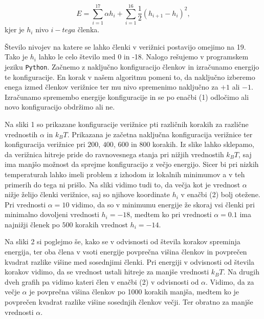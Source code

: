 \documentclass[slovene,11pt,a4paper]{article}
\begin{document}
\begin{equation}
E = \sum_{i=1}^{17} \alpha h_i + \sum_{i=1}^{16} \frac{1}{2} (h_{i+1} - h_i)^2,
\end{equation}
kjer je $h_i$ nivo $i-tega$ členka.

Število nivojev na katere se lahko členki v verižnici postavijo omejimo na 19. Tako je $h_i$ lahko le celo število med 0 in -18. Nalogo rešujemo v programskem jeziku \texttt{Python}. Začnemo z naključno konfiguracijo členkov in izračunamo energijo te konfiguracije. En korak v našem algoritmu pomeni to, da naključno izberemo enega izmed členkov verižnice ter mu nivo spremenimo naključno za $+1$ ali $-1$. Izračunamo spremembo energije konfiguracije in se po enačbi (1) odločimo ali novo konfiguracijo obdržimo ali ne.

Na sliki 1 so prikazane konfiguracije verižnice pti različnih korakih za različne vrednostih $\alpha$ in $k_BT$. Prikazana je začetna naključna konfiguracija verižnice ter konfiguracija verižnice pri $200$, $400$, $600$ in $800$ korakih. Iz slike lahko sklepamo, da verižnica hitreje pride do ravnovesnega stanja pri nižjih vrednostih $k_BT$, saj ima manjšo možnost da sprejme konfiguracijo z večjo energijo. Sicer bi pri nizkih temperaturah lahko imeli problem z izhodom iz lokalnih minimumov a v teh primerih do tega ni prišlo. Na sliki vidimo tudi to, da večja kot je vrednost $\alpha$ nižje želijo členki verižnice, saj so njihove koordinate $h_i$ v enačbi (2) bolj otežene. Pri vrednosti $\alpha=10$ vidimo, da so v minimumu energije že skoraj vsi členki pri minimalno dovoljeni vrednosti $h_i = -18$, medtem ko pri vrednosti $\alpha=0.1$ ima najnižji členek po $500$ korakih vrednost $h_i = -14$.

Na sliki 2 si poglejmo še, kako se v odvisnosti od števila korakov spreminja energija, ter oba člena v vsoti energije povprečna višina členkov in povprečen kvadrat razlike višine med sosednjimi členki. Pri energiji v odvisnosti od števila korakov vidimo, da se vrednost ustali hitreje za manjše vrednosti $k_BT$. Na drugih dveh grafih pa vidimo kateri člen v enačbi (2) v odvisnosti od $\alpha$. Vidimo, da za večje $\alpha$ je povprečna višina členkov po 1000 korakih manjša, medtem ko je povprečen kvadrat razlike višine sosednjih členkov večji. Ter obratno za manjše vrednosti $\alpha$.

\newpage
\end{document}
